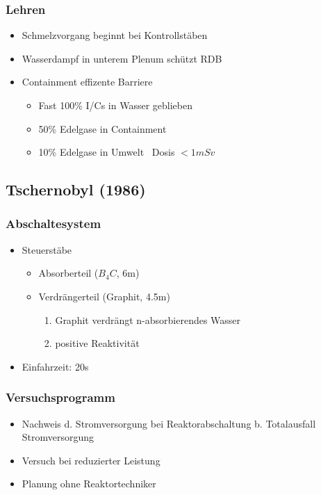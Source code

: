 \documentclass[12pt]{article}
\begin{document}
\subsubsection{Lehren}
\begin{itemize}
  \item Schmelzvorgang beginnt bei Kontrollstäben
  \item Wasserdampf in unterem Plenum schützt RDB
  \item Containment effizente Barriere
  \begin{itemize}
    \item Fast 100\% I/Cs in Wasser geblieben
    \item 50\% Edelgase in Containment
    \item 10\% Edelgase in Umwelt \textrightarrow\ Dosis \(<1 mSv\)
  \end{itemize}
\end{itemize}

\subsection{Tschernobyl (1986)}

\subsubsection{Abschaltesystem}
\begin{itemize}
  \item Steuerstäbe
  \begin{itemize}
    \item Absorberteil (\(B_4C\), 6m)
    \item Verdrängerteil (Graphit, 4.5m)
    \begin{enumerate}[label = \textrightarrow]
    \item Graphit verdrängt n-absorbierendes Wasser
    \item positive Reaktivität
    \end{enumerate}
  \end{itemize}
  \item Einfahrzeit: 20s
\end{itemize}

\subsubsection{Versuchsprogramm}
\begin{itemize}
  \item Nachweis d. Stromversorgung bei Reaktorabschaltung b. Totalausfall Stromversorgung
  \item Versuch bei reduzierter Leistung
  \item Planung ohne Reaktortechniker
\end{itemize}
\end{document}
